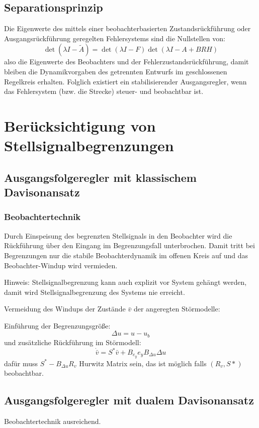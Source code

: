 \subsection{Separationsprinzip}
Die Eigenwerte des mittels einer beobachterbasierten Zustandsrückführung oder
Ausgangsrückführung geregelten Fehlersystems sind die Nullstellen von:
\begin{equation}
    \det (\lambda I - \tilde{A}) = \det(\lambda I - F) \det(\lambda I - A + BRH)
\end{equation}
also die Eigenwerte des Beobachters und der Fehlerzustandsrückführung, damit bleiben
die Dynamikvorgaben des getrennten Entwurfs im geschlossenen Regelkreis erhalten.
Folglich existiert ein stabilisierender Ausgangsregler, wenn das Fehlersystem (bzw.
die Strecke) steuer- und beobachtbar ist.

\section{Berücksichtigung von Stellsignalbegrenzungen}
\subsection{Ausgangsfolgeregler mit klassischem Davisonansatz}
\subsubsection{Beobachtertechnik}
Durch Einspeisung des begrenzten Stellsignals in den Beobachter wird die Rückführung
über den Eingang im Begrenzungsfall unterbrochen. Damit tritt bei Begrenzungen nur die
stabile Beobachterdynamik im offenen Kreis auf und das Beobachter-Windup wird vermieden.

\vspace{.5cm}

Hinweis: Stellsignalbegrenzung kann auch explizit vor System gehängt werden, damit
wird Stellsignalbegrenzung des Systems nie erreicht.

\vspace{.5cm}

Vermeidung des Windups der Zustände $\bar{v}$ der angeregten Störmodelle:

Einführung der Begrenzungsgröße:
\begin{equation}
    \Delta u  = u - u_b
\end{equation}
und zusätzliche Rückführung im Störmodell:
\begin{equation}
    \dot{\bar{v}} = S^* \bar{v} + B_{e_y} e_y B_{\Delta u} \Delta u
\end{equation}
dafür muss $S^*-B_{\Delta u}R_v$ Hurwitz Matrix sein, das ist möglich falls $(R_v, S*)$
beobachtbar.

\subsection{Ausgangsfolgeregler mit dualem Davisonansatz}
Beobachtertechnik ausreichend.

